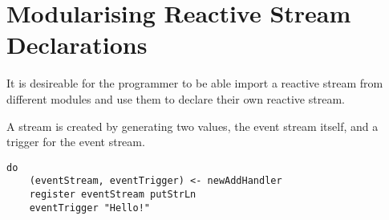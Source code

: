 \documentclass[11pt]{article}
\date{\today}
\title{}
\begin{document}
\tableofcontents

\section{Modularising Reactive Stream Declarations}
\label{sec:org16778ed}

It is desireable for the programmer to be able import a reactive stream from different modules and use
them to declare their own reactive stream.

A stream is created by generating two values, the event stream itself, and a trigger for the event stream.
\begin{verbatim}
do
    (eventStream, eventTrigger) <- newAddHandler
    register eventStream putStrLn
    eventTrigger "Hello!"
\end{verbatim}
\end{document}
